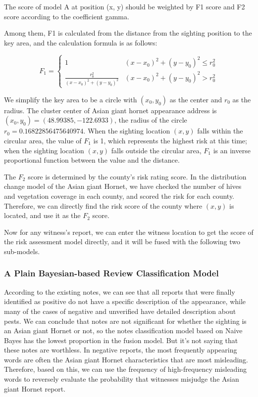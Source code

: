 \documentclass{mcmthesis}
\numberwithin{figure}{section}
\numberwithin{table}{section}
\begin{document}
The score of model A at position (x, y) should be weighted by F1 score and F2 score according to the coefficient gamma. 

Among them, F1 is calculated from the distance from the sighting position to the key area, and the calculation formula is as follows:

\begin{equation}
  F_1 = \begin{cases}
    1 & (x-x_0)^2 + (y - y_0)^2 \leq r_{0}^2 \\
    \frac{r_{0}^2}{(x-x_0)^2+(y-y_0)^2} & (x-x_0)^2 + (y-y_0)^2 > r_{0}^2

  \end{cases}
\end{equation}

We simplify the key area to be a circle with $(x_0, y_0)$ as the center and $r_0$ as the radius. The cluster center of Asian giant hornet appearance address is $(x_0, y_0)=(48.99385, -122.6933)$, the radius of the circle $r_0=0.16822856475640974$. When the sighting location  $(x, y)$ falls within the circular area, the value of $F_1$ is 1, which represents the highest risk at this time; when the sighting location $(x, y)$ falls outside the circular area, $F_1$ is an inverse proportional function between the value and the distance. 

The $F_2$ score is determined by the county's risk rating score. In the distribution change model of the Asian giant Hornet, we have checked the number of hives and vegetation coverage in each county, and scored the risk for each county. Therefore, we can directly find the risk score of the county where $(x,y)$ is located, and use it as the $F_2$ score. 

Now for any witness’s report, we can enter the witness location to get the score of the risk assessment model directly, and it will be fused with the following two sub-models.

\subsubsection{A Plain Bayesian-based Review Classification Model}

According to the existing notes, we can see that all reports that were finally identified as positive do not have a specific description of the appearance, while many of the cases of negative and unverified have detailed description about pests. We can conclude that notes are not significant for whether the sighting is an Asian giant Hornet or not, so the notes classification model based on Naive Bayes has the lowest proportion in the fusion model. But it's not saying that these notes are worthless. In negative reports, the most frequently appearing words are often the Asian giant Hornet characteristics that are most misleading. Therefore, based on this, we can use the frequency of high-frequency misleading words to reversely evaluate the probability that witnesses misjudge the Asian giant Hornet report.
\end{document}

